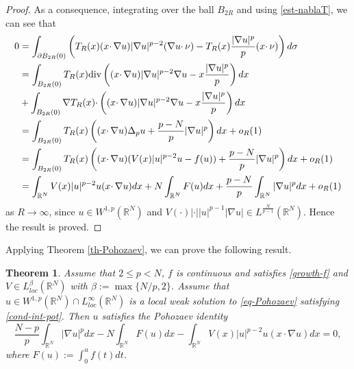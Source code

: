 \documentclass[11pt,reqno]{amsart}
\newtheorem{theorem}{Theorem}
\theoremstyle{definition}
\numberwithin{equation}{section}
\numberwithin{theorem}{section}
\numberwithin{equation}{section}
\numberwithin{theorem}{section}
\newcommand{\R}{\mathbb{R}}
\begin{document}
\begin{proof}
As a consequence, integrating over the ball $B_{2R}$ and using \eqref{est-nablaT}, we can see that
\begin{equation}\label{int-R}
\begin{aligned}
0&=\int_{\partial B_{2R}(0)}\left(T_R(x)(x\cdotp \nabla u)|\nabla u|^{p-2}(\nabla u\cdotp \nu)-T_R(x)\frac{|\nabla u|^p}{p}(x\cdotp\nu)\right)d\sigma\\
&=\int_{B_{2R}(0)} T_R(x){\rm div}\left((x\cdotp \nabla u)|\nabla u|^{p-2}\nabla u-x\frac{|\nabla u|^p}{p}\right)dx\\
&+\int_{B_{2R}(0)} \nabla T_R(x)\cdotp \left((x\cdotp \nabla u)|\nabla u|^{p-2}\nabla u-x\frac{|\nabla u|^p}{p}\right)dx\\
&=\int_{B_{2R}(0)}T_R(x)\left((x\cdotp \nabla u) \Delta_p u+\frac{p-N}{p}|\nabla u|^p\right)dx+o_R(1)\\
&=\int_{B_{2R}(0)}T_R(x)\left((x\cdotp\nabla u)(V(x)|u|^{p-2}u-f(u))+\frac{p-N}{p}|\nabla u|^p\right)dx+o_R(1)\\
&=\int_{\R^N}V(x)|u|^{p-2}u(x\cdotp\nabla u)dx+N\int_{\R^N}F(u)dx+\frac{p-N}{p}\int_{\R^N}|\nabla u|^pdx+o_R(1)
\end{aligned}
\end{equation}
as $R\to\infty$, since $u\in W^{1,p}(\R^N)$ and $V(\cdotp)|\cdotp||u|^{p-1}|\nabla u|\in L^{\frac{N}{p-1}}(\R^N)$. Hence the result is proved.
\end{proof}
Applying Theorem \ref{th-Pohozaev}, we can prove the following result.
\begin{theorem}\label{cor-loc-bd}
Assume that $2\le p<N$, $f$ is continuous and satisfies \eqref{growth-f} and $V\in L^{\beta}_{loc}(\R^N) $ with $\beta:=\max\{N/p,2\}$. %
Assume that $u\in W^{1,p}(\R^N)\cap L^\infty_{loc}(\R^N)$ is a local weak solution to \eqref{eq-Pohozaev} satisfying \eqref{cond-int-pot}. Then $u$ satisfies the Pohozaev identity
\begin{equation}\label{pohozaev}
\frac{N-p}{p}\int_{\R^N}|\nabla u|^pdx-N\int_{\R^N}F(u) dx-\int_{\R^N}V(x)|u|^{p-2}u(x\cdotp\nabla u)dx=0, 
\end{equation}    
where $F(u):=\int_0^u f(t)dt$.
\end{theorem}
\end{document}
